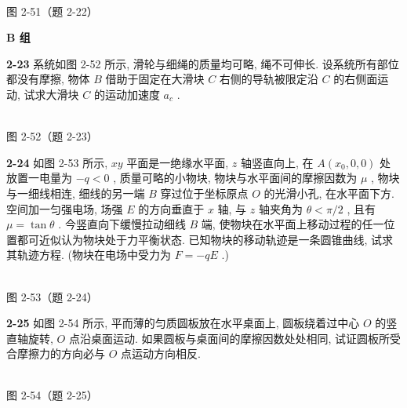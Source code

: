 \begin{center}
\resizebox{0.19\textwidth}{!}{}\\[4pt]
{\small 图 2-51（题 2-22）}
\end{center}

\newpage

\begin{center}\textbf{B 组}\end{center}

\textbf{2-23} 系统如图 2-52 所示, 滑轮与细绳的质量均可略, 绳不可伸长. 设系统所有部位都没有摩擦, 物体 $B$ 借助于固定在大滑块 $C$ 右侧的导轨被限定沿 $C$ 的右侧面运动, 试求大滑块 $C$ 的运动加速度 $a_{c}$ .

\begin{center}
\resizebox{0.48\textwidth}{!}{}\\[4pt]
{\small 图 2-52（题 2-23）}
\end{center}

\newpage

\textbf{2-24} 如图 2-53 所示, $xy$ 平面是一绝缘水平面, $z$ 轴竖直向上, 在 $A(x_0,0,0)$ 处放置一电量为 $-q < 0$ , 质量可略的小物块, 物块与水平面间的摩擦因数为 $\mu$ , 物块与一细线相连, 细线的另一端 $B$ 穿过位于坐标原点 $O$ 的光滑小孔, 在水平面下方. 空间加一匀强电场, 场强 $E$ 的方向垂直于 $x$ 轴, 与 $z$ 轴夹角为 $\theta < \pi / 2$ , 且有 $\mu = \tan \theta$ . 今竖直向下缓慢拉动细线 $B$ 端, 使物块在水平面上移动过程的任一位置都可近似认为物块处于力平衡状态. 已知物块的移动轨迹是一条圆锥曲线, 试求其轨迹方程. (物块在电场中受力为 $F = -qE$ .)

\begin{center}
\resizebox{0.48\textwidth}{!}{}\\[4pt]
{\small 图 2-53（题 2-24）}
\end{center}

\newpage

\textbf{2-25} 如图 2-54 所示, 平而薄的匀质圆板放在水平桌面上, 圆板绕着过中心 $O$ 的竖直轴旋转, $O$ 点沿桌面运动. 如果圆板与桌面间的摩擦因数处处相同, 试证圆板所受合摩擦力的方向必与 $O$ 点运动方向相反.

\begin{center}
\resizebox{0.32\textwidth}{!}{}\\[4pt]
{\small 图 2-54（题 2-25）}
\end{center}

